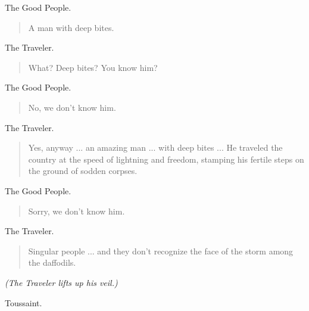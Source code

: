\documentclass[letterpaper,article,12pt,oneside,notitlepage]{memoir}
\begin{document}
\begin{center}The Good People.\end{center}

\begin{verse}
A man with deep bites. \\
\end{verse}

\begin{center}The Traveler.\end{center}

\begin{verse}
What? Deep bites? You know him? \\
\end{verse}

\begin{center}The Good People.\end{center}

\begin{verse}
No, we don't know him. \\
\end{verse}

\begin{center}The Traveler.\end{center}

\begin{verse}
Yes, anyway ... an amazing man ... with deep bites ... He traveled the country at the speed of lightning and freedom, stamping his fertile steps on the ground of sodden corpses. \\
\end{verse}

\begin{center}The Good People.\end{center}

\begin{verse}
Sorry, we don't know him. \\
\end{verse}

\begin{center}The Traveler.\end{center}

\begin{verse}
Singular people ... and they don't recognize the face of the storm among the daffodils. \\
\end{verse}

\textit{(The Traveler lifts up his veil.)}

\begin{center}Toussaint.\end{center}
\end{document}
